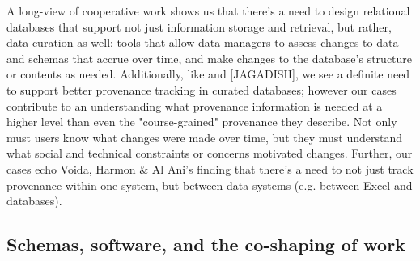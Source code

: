 A long-view of cooperative work shows us that there's a need to design relational databases that support not just information storage and retrieval, but rather, data curation as well: tools that allow data managers to assess changes to data and schemas that accrue over time, and make changes to the database's structure or contents as needed. Additionally, like \cite{Buneman_2006} and [JAGADISH], we see a definite need to support better provenance tracking in curated databases; however our cases contribute to an understanding what provenance information is needed at a higher level than even the "course-grained" provenance they describe. Not only must users know what changes were made over time, but they must understand what social and technical constraints or concerns motivated changes. Further, our cases echo Voida, Harmon & Al Ani's finding that there's a need to not just track provenance within one system, but between data systems (e.g. between Excel and databases).

\subsection{Schemas, software, and the co-shaping of work}


